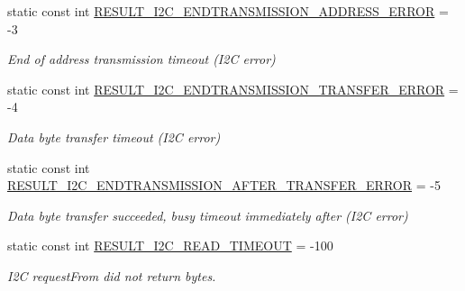 \begin{DoxyCompactItemize}
\mbox{\label{class_d_s2482_command_a86ab4e71883e0d7aafec142fe1010c35}} 
static const int \mbox{\hyperlink{class_d_s2482_command_a86ab4e71883e0d7aafec142fe1010c35}{R\+E\+S\+U\+L\+T\+\_\+\+I2\+C\+\_\+\+E\+N\+D\+T\+R\+A\+N\+S\+M\+I\+S\+S\+I\+O\+N\+\_\+\+A\+D\+D\+R\+E\+S\+S\+\_\+\+E\+R\+R\+OR}} = -\/3
\begin{DoxyCompactList}\small\item\em End of address transmission timeout (I2C error) \end{DoxyCompactList}\item 
\mbox{\label{class_d_s2482_command_a84eb07550c7499ea510a32e4d968ed79}} 
static const int \mbox{\hyperlink{class_d_s2482_command_a84eb07550c7499ea510a32e4d968ed79}{R\+E\+S\+U\+L\+T\+\_\+\+I2\+C\+\_\+\+E\+N\+D\+T\+R\+A\+N\+S\+M\+I\+S\+S\+I\+O\+N\+\_\+\+T\+R\+A\+N\+S\+F\+E\+R\+\_\+\+E\+R\+R\+OR}} = -\/4
\begin{DoxyCompactList}\small\item\em Data byte transfer timeout (I2C error) \end{DoxyCompactList}\item 
\mbox{\label{class_d_s2482_command_a20e56c958623278decd13f644c5f680a}} 
static const int \mbox{\hyperlink{class_d_s2482_command_a20e56c958623278decd13f644c5f680a}{R\+E\+S\+U\+L\+T\+\_\+\+I2\+C\+\_\+\+E\+N\+D\+T\+R\+A\+N\+S\+M\+I\+S\+S\+I\+O\+N\+\_\+\+A\+F\+T\+E\+R\+\_\+\+T\+R\+A\+N\+S\+F\+E\+R\+\_\+\+E\+R\+R\+OR}} = -\/5
\begin{DoxyCompactList}\small\item\em Data byte transfer succeeded, busy timeout immediately after (I2C error) \end{DoxyCompactList}\item 
\mbox{\label{class_d_s2482_command_aa506510a75cc5ea560b105b03aa332f1}} 
static const int \mbox{\hyperlink{class_d_s2482_command_aa506510a75cc5ea560b105b03aa332f1}{R\+E\+S\+U\+L\+T\+\_\+\+I2\+C\+\_\+\+R\+E\+A\+D\+\_\+\+T\+I\+M\+E\+O\+UT}} = -\/100
\begin{DoxyCompactList}\small\item\em I2C request\+From did not return bytes. \end{DoxyCompactList}\item 
\mbox{\label{class_d_s2482_command_a99ae8c5d50b7e7564cc2461bb96984d9}} 

\end{DoxyCompactItemize}

